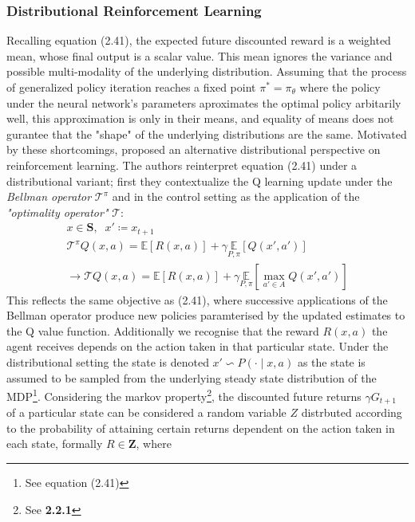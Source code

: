 \subsubsection{Distributional Reinforcement Learning}
Recalling equation (2.41), the expected future discounted reward is a weighted mean,
whose final output is a scalar value. This mean ignores the variance and possible multi-modality
of the underlying distribution. Assuming that the process of generalized policy iteration
reaches a fixed point $\pi^* = \pi_\theta$ where the policy under the neural network's parameters
aproximates the optimal policy arbitarily well, this approximation is only in their means, and equality
of means does not gurantee that the "shape" of the underlying distributions are the same.
Motivated by these shortcomings, \cite{Bellemare2017} proposed an alternative distributional perspective
on reinforcement learning. The authors reinterpret equation (2.41) under a distributional variant;
first they contextualize the Q learning update under the \emph{Bellman operator} $\mathcal{T}^\pi$ and in the control setting
as the application of the \emph{"optimality operator"} $\mathcal{T}$:
\begin{equation}
    \begin{gathered}
        x \in \mathbf{S}, \;\; x' \coloneqq x_{t+1}\\
        \mathcal{T}^\pi Q(x,a) = \mathbb{E}[R(x,a)] + \gamma \underset{P,\pi}{\mathbb{E}} [Q(x',a')] \\
        \rightarrow \mathcal{T} Q(x,a) = \mathbb{E}[R(x,a)] + \gamma \underset{P,\pi}{\mathbb{E}} [\max_{a' \in A}Q(x',a')]
    \end{gathered}
\end{equation}
This reflects the same objective as (2.41), where successive applications of the Bellman operator
produce new policies paramterised by the updated estimates to the Q value function. Additionally we recognise
that the reward $R(x,a)$ the agent receives depends on the action taken in that particular state. Under the
distributional setting the state is denoted $x' \backsim P( \cdot \mid x, a)$ as the state is assumed
to be sampled from the underlying steady state distribution of the MDP\footnote{See equation (2.41)}.
Considering the markov property\footnote{See \textbf{2.2.1}}, the discounted future returns $\gamma G_{t+1}$ of a particular state
can be considered a random variable $Z$ distrbuted according to the probability of attaining
certain returns dependent on the action taken in each state, formally $R \in \mathbf{Z}$, where
